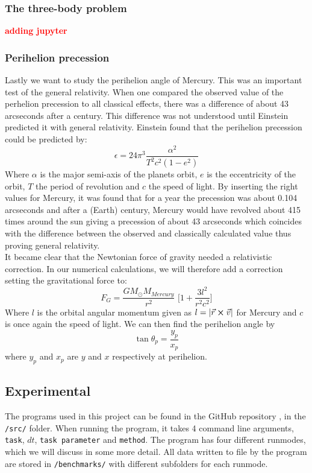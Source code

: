 \documentclass{article}
\newcommand\red[1]{\textcolor{red}{\textbf{#1}}}
\newcommand{\TomH}[1]{\Big[ #1 \Big]}
\begin{document}
\subsubsection{The three-body problem}
\red{adding jupyter}

\subsubsection{Perihelion precession}
Lastly we want to study the perihelion angle of Mercury. This was an important test of the general relativity. When one compared the observed value of the perhelion precession to all classical effects, there was a difference of about 43 arcseconds after a century. This difference was not understood until Einstein predicted it with general relativity.\cite{Perhelion} Einstein found that the perihelion precession could be predicted by:
\begin{equation}
\epsilon = 24 \pi^3 \frac{\alpha^2}{T^2 c^2 (1 - e^2)}
\label{eq:perihelion}
\end{equation}
Where $\alpha$ is the major semi-axis of the planets orbit, $e$ is the eccentricity of the orbit, $T$ the period of revolution and $c$ the speed of light. By inserting the right values for Mercury, it was found that for a year the precession was about 0.104 arcseconds and after a (Earth) century, Mercury would have revolved about 415 times around the sun giving a precession of about 43 arcseconds which coincides with the difference between the observed and classically calculated value thus proving general relativity. \\
It became clear that the Newtonian force of gravity needed a relativistic correction. In our numerical calculations, we will therefore add a correction setting the gravitational force to:
\begin{equation}
F_G = \frac{G M_{\odot} M_{Mercury}}{r^2} \, \, \TomH{1 + \frac{3l^2}{r^2c^2}}
\label{eq:FgGR}
\end{equation}
Where $l$ is the orbital angular momentum given as $l = |\vec{r} \cross \vec{v}|$ for Mercury and $c$ is once again the speed of light.
We can then find the perihelion angle by
\begin{equation}
\tan \theta_p = \frac{y_p}{x_p}
\end{equation}
where $y_p$ and $x_p$ are $y$ and $x$ respectively at perihelion.
\subsection{Experimental}
The programs used in this project can be found in the GitHub repository \cite{Github}, in the \texttt{/src/} folder. When running the program, it takes 4 command line arguments, \texttt{task}, $dt$, \texttt{task parameter} and \texttt{method}. The program has four different runmodes, which we will discuss in some more detail. All data written to file by the program are stored in \texttt{/benchmarks/} with different subfolders for each runmode.
\end{document}
